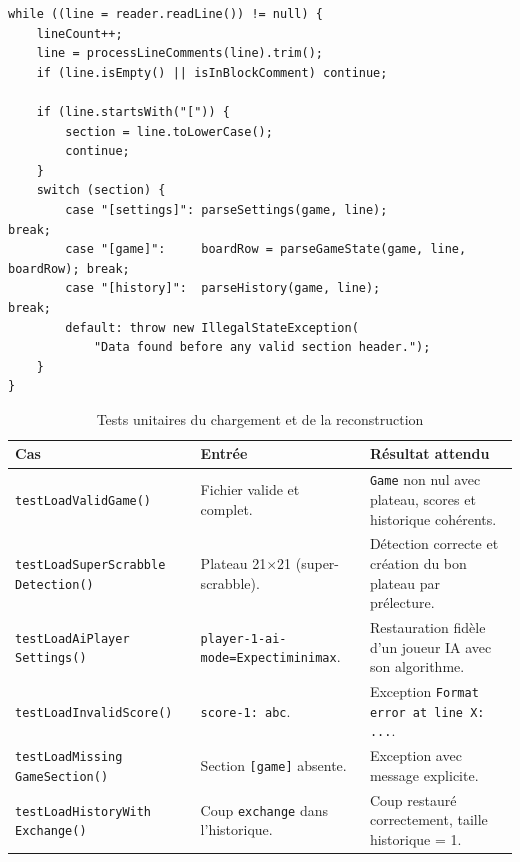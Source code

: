 \documentclass[a4paper]{article}
\begin{document}
\begin{samepage}
\begin{besoinbox}
    \begin{verbatim}
while ((line = reader.readLine()) != null) {
    lineCount++;
    line = processLineComments(line).trim();
    if (line.isEmpty() || isInBlockComment) continue;

    if (line.startsWith("[")) {
        section = line.toLowerCase();
        continue;
    }
    switch (section) {
        case "[settings]": parseSettings(game, line);              break;
        case "[game]":     boardRow = parseGameState(game, line, boardRow); break;
        case "[history]":  parseHistory(game, line);               break;
        default: throw new IllegalStateException(
            "Data found before any valid section header.");
    }
}
    \end{verbatim}
\end{besoinbox}

\begin{table}[H]
    \centering
    \small
    \begin{tabular}{p{4.5cm} p{4.5cm} p{5.5cm}}
        \toprule
        \textbf{Cas} & \textbf{Entrée} & \textbf{Résultat attendu} \\
        \midrule
        \texttt{testLoadValidGame()} & Fichier valide et complet. & \texttt{Game} non nul avec plateau, scores et historique cohérents. \\
        \midrule
        \texttt{testLoadSuperScrabble Detection()} & Plateau 21$\times$21 (super-scrabble). & Détection correcte et création du bon plateau par prélecture. \\
        \midrule
        \texttt{testLoadAiPlayer Settings()} & \texttt{player-1-ai-mode=Expectiminimax}. & Restauration fidèle d'un joueur IA avec son algorithme. \\
        \midrule
        \texttt{testLoadInvalidScore()} & \texttt{score-1: abc}. & Exception \texttt{Format error at line X: ...}. \\
        \midrule
        \texttt{testLoadMissing GameSection()} & Section \texttt{[game]} absente. & Exception avec message explicite. \\
        \midrule
        \texttt{testLoadHistoryWith Exchange()} & Coup \texttt{exchange} dans l'historique. & Coup restauré correctement, taille historique = 1. \\
        \bottomrule
    \end{tabular}
    \caption{Tests unitaires du chargement et de la reconstruction}
\end{table}


\end{samepage}
\end{document}

